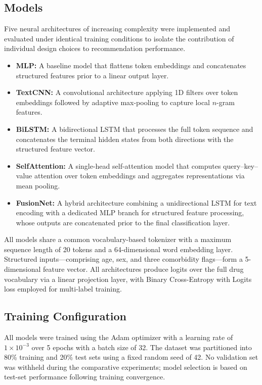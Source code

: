 \subsection{Models}
Five neural architectures of increasing complexity were implemented and evaluated under identical training conditions to isolate the contribution of individual design choices to recommendation performance.

\begin{itemize}
    \item \textbf{MLP:} A baseline model that flattens token embeddings and concatenates structured features prior to a linear output layer.
    \item \textbf{TextCNN:} A convolutional architecture applying 1D filters over token embeddings followed by adaptive max-pooling to capture local $n$-gram features.
    \item \textbf{BiLSTM:} A bidirectional LSTM that processes the full token sequence and concatenates the terminal hidden states from both directions with the structured feature vector.
    \item \textbf{SelfAttention:} A single-head self-attention model that computes query--key--value attention over token embeddings and aggregates representations via mean pooling.
    \item \textbf{FusionNet:} A hybrid architecture combining a unidirectional LSTM for text encoding with a dedicated MLP branch for structured feature processing, whose outputs are concatenated prior to the final classification layer.
\end{itemize}

All models share a common vocabulary-based tokenizer with a maximum sequence length of 20 tokens and a 64-dimensional word embedding layer. Structured inputs---comprising age, sex, and three comorbidity flags---form a 5-dimensional feature vector. All architectures produce logits over the full drug vocabulary via a linear projection layer, with Binary Cross-Entropy with Logits loss employed for multi-label training.

\subsection{Training Configuration}
All models were trained using the Adam optimizer with a learning rate of $1 \times 10^{-3}$ over 5 epochs with a batch size of 32. The dataset was partitioned into 80\% training and 20\% test sets using a fixed random seed of 42. No validation set was withheld during the comparative experiments; model selection is based on test-set performance following training convergence.

